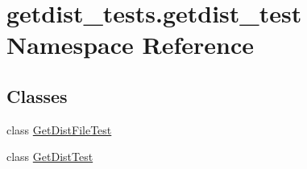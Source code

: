 \hypertarget{namespacegetdist__tests_1_1getdist__test}{}\section{getdist\+\_\+tests.\+getdist\+\_\+test Namespace Reference}
\label{namespacegetdist__tests_1_1getdist__test}
\subsection*{Classes}
\begin{DoxyCompactItemize}
\item 
class \mbox{\hyperlink{classgetdist__tests_1_1getdist__test_1_1GetDistFileTest}{Get\+Dist\+File\+Test}}
\item 
class \mbox{\hyperlink{classgetdist__tests_1_1getdist__test_1_1GetDistTest}{Get\+Dist\+Test}}
\end{DoxyCompactItemize}
